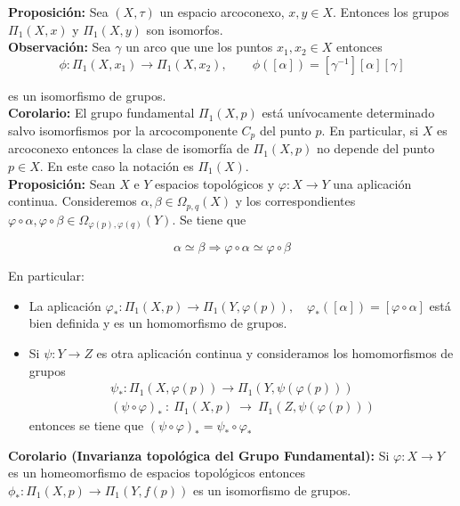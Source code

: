 \documentclass{article}
\begin{document}
\textbf{Proposición:} Sea $(X,\tau)$ un espacio arcoconexo, $x,y\in X$. Entonces los grupos $\Pi_1(X,x)$ y $\Pi_1(X,y)$ son isomorfos.\\

\textbf{Observación:} Sea $\gamma$ un arco que une los puntos $x_1,x_2\in X$ entonces 
\begin{equation*}
\phi:\Pi_1(X,x_1)\rightarrow \Pi_1(X,x_2),\qquad \phi([\alpha])=[\gamma^{-1}][\alpha][\gamma]
\end{equation*}

es un isomorfismo de grupos. \\

\textbf{Corolario:} El grupo fundamental $\Pi_1(X,p)$ está unívocamente determinado salvo isomorfismos por la arcocomponente $C_p$ del punto $p$. En particular, si $X$ es arcoconexo entonces la clase de isomorfía de $\Pi_1(X,p)$ no depende del punto $p\in X$. En este caso la notación es $\Pi_1(X)$. \\

\textbf{Proposición:} Sean $X$ e $Y$ espacios topológicos y $\varphi:X\rightarrow Y$ una aplicación continua. Consideremos $\alpha,\beta\in \Omega_{p,q}(X)$ y los correspondientes $\varphi\circ\alpha,\varphi\circ\beta\in \Omega_{\varphi(p),\varphi(q)}(Y)$. Se tiene que

\begin{equation*}
\alpha\simeq \beta \Rightarrow \varphi\circ \alpha \simeq \varphi\circ\beta
\end{equation*}

En particular:
\begin{itemize}
\item La aplicación $\varphi_*:\Pi_1(X,p)\rightarrow \Pi_1(Y,\varphi(p)),\quad\varphi_*([\alpha])=[\varphi\circ\alpha]$ está bien definida y es un homomorfismo de grupos.

\item Si $\psi:Y\rightarrow Z$ es otra aplicación continua y consideramos los homomorfismos de grupos 
\begin{gather*}
\psi_*:\Pi_1(X,\varphi(p))\rightarrow \Pi_1(Y,\psi(\varphi(p)))\\(\psi\circ\varphi)_*~:~\Pi_1(X,p)~\rightarrow~\Pi_1(Z,\psi(\varphi(p)))
\end{gather*}
entonces se tiene que $(\psi\circ\varphi)_*=\psi_*\circ\varphi_*$
\end{itemize}

\textbf{Corolario (Invarianza topológica del Grupo Fundamental):} Si $\varphi:X\rightarrow Y$ es un homeomorfismo de espacios topológicos entonces $\phi_*:\Pi_1(X,p)\rightarrow \Pi_1(Y,f(p))$ es un isomorfismo de grupos.\\
\end{document}
